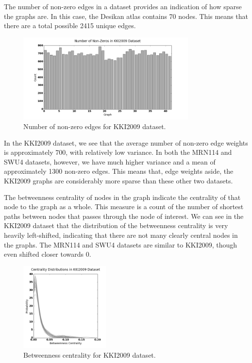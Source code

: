 The number of non-zero edges in a dataset provides an indication of how sparse the graphs are. In this case, the Desikan atlas contains 70 nodes. This means that there are a total possible 2415 unique edges.
\begin{figure}[h!]
\centering
\includegraphics[width=0.8\textwidth]{./stats/KKI2009-nnz.png}
\makeatletter
\let\@currsize\normalsize
\caption{Number of non-zero edges for KKI2009 dataset.}
\end{figure}
In the KKI2009 dataset, we see that the average number of non-zero edge weights is approximately 700, with relatively low variance. In both the MRN114 and SWU4 datasets, however, we have much higher variance and a mean of approximately 1300 non-zero edges. This means that, edge weights aside, the KKI2009 graphs are considerably more sparse than these other two datasets.

The betweenness centrality of nodes in the graph indicate the centrality of that node to the graph as a whole. This measure is a count of the number of shortest paths between nodes that passes through the node of interest. We can see in the KKI2009 dataset that the distribution of the betweenness centrality is very heavily left-shifted, indicating that there are not many clearly central nodes in the graphs. The MRN114 and SWU4 datasets are similar to KKI2009, though even shifted closer towards 0.
\begin{figure}[h!]
\centering
\includegraphics[width=0.4\textwidth]{./stats/KKI2009-centrality.png}
\makeatletter
\let\@currsize\normalsize
\caption{Betweenness centrality for KKI2009 dataset.}
\end{figure}

